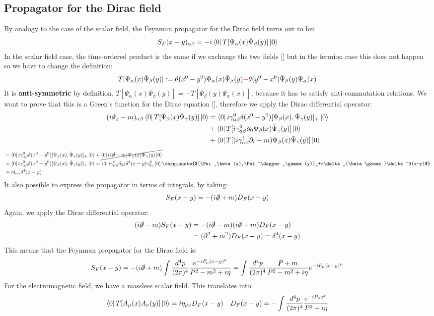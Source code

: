 \documentclass[../main.tex]{subfiles}
\begin{document}
\subsection{Propagator for the Dirac field}
By analogy to the case of the scalar field, the Feynman propagator for the Dirac field turns out to be:
\[
S_F(x-y)_{\alpha\beta}=-i\bra{0}T[\Psi_\alpha(x)\bar{\Psi}_\beta(y)]\ket{0}
\]
In the scalar field case, the time-ordered product is the same if we exchange the two fields [] but in the fermion case this does not happen so we have to change the definition:
\[
T[\Psi_\alpha(x)\bar{\Psi}_\beta(y)]:=\theta(x^0-y^0)\Psi_\alpha(x)\bar{\Psi}_\beta(y){\color{red}-}\theta(y^0-x^0)\bar{\Psi}_\beta(y)\Psi_\alpha(x)
\]
It is \textbf{anti-symmetric} by definition, $T[\Psi_\alpha(x)\bar{\Psi}_\beta(y)]=-T[\bar{\Psi}_\beta(y)\Psi_\alpha(x)]$, because it has to satisfy anti-commutation relations. We want to prove that this is a Green's function for the Dirac equation [], therefore we apply the Dirac differential operator:
\begin{align*}
(i\slashed{\partial}_x-m)_{\alpha\beta}\bra{0}T[\Psi_\beta(x)\bar{\Psi}_\gamma(y)]\ket{0}&=\bra{0}i\gamma_{\alpha\beta}^0\delta(x^0-y^0)[\Psi_\beta(x),\bar{\Psi}_\gamma(y)]_+\ket{0}\\
&+\bra{0}T[i\gamma^0_{\alpha\beta}\partial_0\Psi_\beta(x)\bar{\Psi}_\gamma(y)]\ket{0}\\
&+\bra{0}T[(i\gamma^i_{\alpha\beta}\partial_i-m)\Psi_\beta(x)\bar{\Psi}_\gamma(y)]\ket{0}
\end{align*}
\begin{align*}
&=\bra{0}i\gamma_{\alpha\beta}^0\delta(x^0-y^0)[\Psi_\beta(x),\bar{\Psi}_\gamma(y)]_+\ket{0}+\cancel{\bra{0}(i\slashed{\partial}-m)\Psi_\beta(x)\bar{\Psi}_\gamma(y)\ket{0}}\\
&=\bra{0}i\gamma_{\alpha\beta}^0\delta(x^0-y^0)[\Psi_\beta(x),\bar{\Psi}_\gamma(y)]_+\ket{0}=\bra{0}i\gamma^0_{\alpha\beta}\delta_{\beta\delta}\delta^4(x-y)\gamma^0_{\delta\gamma}\ket{0}\marginnote{$[\Psi_\beta(x),\Psi^\dagger_\gamma(y)]_+=\delta_{\beta\gamma}\delta^3(x-y)$}\\
&=i\delta_{\alpha\gamma}\delta^4(x-y)
\end{align*}
It also possible to express the propagator in terms of integrals, by taking:
\[
S_F(x-y)=-(i\slashed{\partial}+m)D_F(x-y)
\]
Again, we apply the Dirac differential operator:
\begin{align*}
(i\slashed{\partial}-m)S_F(x-y)&=-(i\slashed{\partial}-m)(i\slashed{\partial}+m)D_F(x-y)\\
&=(\partial^2+m^2)D_F(x-y)=\delta^4(x-y)
\end{align*}
This means that the Feynman propagator for the Dirac field is:
\[
S_F(x-y)=-(i\slashed{\partial}+m)\int\frac{d^4p}{(2\pi)^4}\frac{e^{-iP_\mu(x-y)^\mu}}{P^2-m^2+i\eta}=\int\frac{d^4p}{(2\pi)^4}\frac{\slashed{P}+m}{P^2-m^2+i\eta}e^{-iP_\mu(x-y)^\mu}
\]
For the electromagnetic field, we have a massless scalar field. This translates into:
\[
\bra{0}T[A_\mu(x)A_\nu(y)]\ket{0}=i\eta_{\mu\nu}D_F(x-y) \quad D_F(x-y)=-\int\frac{d^4p}{(2\pi)^4}\frac{e^{-iP_\mu x^\mu}}{P^2+i\eta}
\]
\end{document}
